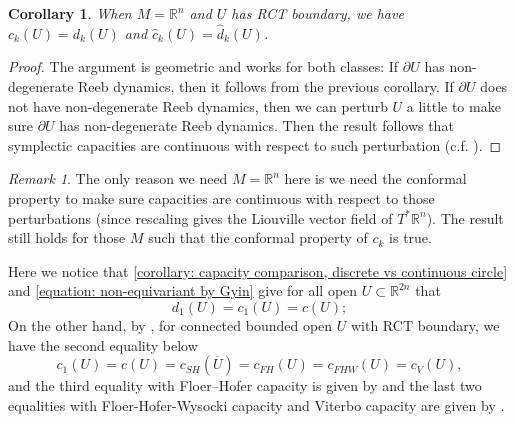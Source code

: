 \documentclass[11pt]{amsart}
\numberwithin{equation}{section}
\theoremstyle{plain}
\newtheorem{Coro}[coro]{Corollary}
\theoremstyle{definition}
\theoremstyle{remark}
\newtheorem{RMK}[rmk]{Remark}
\newcommand{\bR} { {\mathbb{R}}}
\begin{document}
\begin{Coro}\label{corollary: capacity comparison, discrete vs continuous circle}When $M=\bR^n$ and $U$ has RCT boundary, we have $c_k(U)=d_k(U)$ and  $\widehat c_k(U)=\widehat d_k(U)$.    \end{Coro}
\begin{proof}The argument is geometric and works for both classes: If $\partial U$ has non-degenerate Reeb dynamics, then it follows from the previous corollary. If $\partial U$ does not have non-degenerate Reeb dynamics, then we can perturb $U$ a little to make sure $\partial U$ has non-degenerate Reeb dynamics. Then the result follows that symplectic capacities are continuous with respect to such perturbation (c.f. \cite[Proposition 3]{EkelandHoferII}).
\end{proof}
\begin{RMK}The only reason we need $M=\bR^n$ here is we need the conformal property to make sure capacities are continuous with respect to those perturbations (since rescaling gives the Liouville vector field of $T^*\bR^n$). The result still holds for those $M$ such that the conformal property of $c_k$ is true.
\end{RMK}
 

Here we notice that \autoref{corollary: capacity comparison, discrete vs continuous circle} and \autoref{equation: non-equivariant by Gyin} give for all open $U\subset \bR^{2n}$ that
\[d_1(U)=c_1(U)=c(U);\]
On the other hand, by \cite{Hochschild-Kuo-Shende-Zhang}, for connected bounded open $U$ with RCT boundary, we have  the second equality below
\begin{equation}\label{eq: c1=c viterbo}
  c_1(U)=c(U)=c_{SH}(\overline{U})=c_{FH}(U)=c_{FHW}(U)=c_{V}(U), \end{equation}
and the third equality with Floer–Hofer capacity is given by \cite[Proposition 5.7]{Hermann2000} and the last two equalities with Floer-Hofer-Wysocki capacity and Viterbo capacity are given by \cite[Proposition 3.2 and Theorem 1.5]{Hermann2004}. 

 
\end{document}
